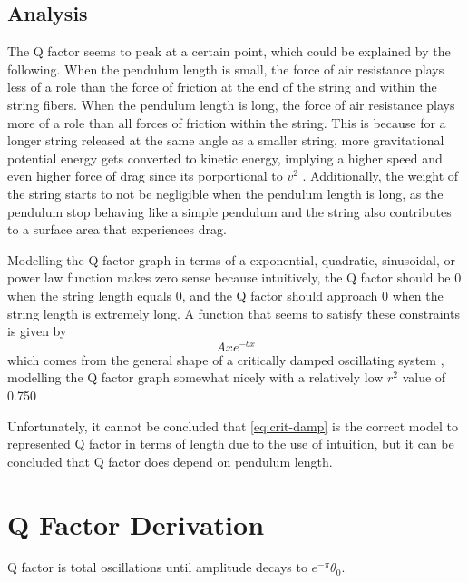 \documentclass[12pt]{article}
\begin{document}
{\subsection{Analysis}
The Q factor seems to peak at a certain point, which could be explained by the following. When the pendulum length is small, the force of air resistance plays less of a role than the force of friction at the end of the string and within the string fibers. When the pendulum length is long, the force of air resistance plays more of a role than all forces of friction within the string. This is because for a longer string released at the same angle as a smaller string, more gravitational potential energy gets converted to kinetic energy, implying a higher speed and even higher force of drag since its porportional to $v^2$ \cite{airdrag}. Additionally, the weight of the string starts to not be negligible when the pendulum length is long, as the pendulum stop behaving like a simple pendulum and the string also contributes to a surface area that experiences drag.

Modelling the Q factor graph in terms of a exponential, quadratic, sinusoidal, or power law function makes zero sense because intuitively, the Q factor should be 0 when the string length equals 0, and the Q factor should approach 0 when the string length is extremely long. A function that seems to satisfy these constraints is given by
\begin{equation} \label{eq:crit-damp}
    Axe^{-bx}
\end{equation}
which comes from the general shape of a critically damped oscillating system \cite{crit-damping}, modelling the Q factor graph somewhat nicely with a relatively low $r^2$ value of 0.750

Unfortunately, it cannot be concluded that \ref{eq:crit-damp} is the correct model to represented Q factor in terms of length due to the use of intuition, but it can be concluded that Q factor does depend on pendulum length.
}

\newpage

\printbibliography[heading=bibintoc]

\newpage

\appendix

\section{Q Factor Derivation}
Q factor is total oscillations until amplitude decays to $e^{-\pi}\theta_0$.
\end{document}

